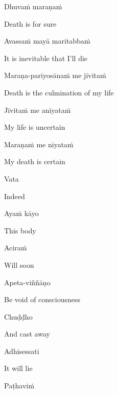Dhuvaṁ maraṇaṁ

\begin{english}
  Death is for sure
\end{english}

Avassaṁ mayā maritabbaṁ

\begin{english}
  It is inevitable that I'll die
\end{english}

Maraṇa-pariyosānaṁ me jīvitaṁ

\begin{english}
  Death is the culmination of my life
\end{english}

Jīvitaṁ me aniyataṁ

\begin{english}
  My life is uncertain
\end{english}

Maraṇaṁ me niyataṁ

\begin{english}
  My death is certain
\end{english}

\suttaRef{[Dhp A]}

Vata

\begin{english}
  Indeed
\end{english}

Ayaṁ kāyo

\begin{english}
  This body
\end{english}

Aciraṁ

\begin{english}
  Will soon
\end{english}

Apeta-viññāṇo

\begin{english}
  Be void of consciousness
\end{english}

Chuḍḍho

\begin{english}
  And cast away
\end{english}

Adhisessati

\begin{english}
  It will lie
\end{english}

Paṭhaviṁ


